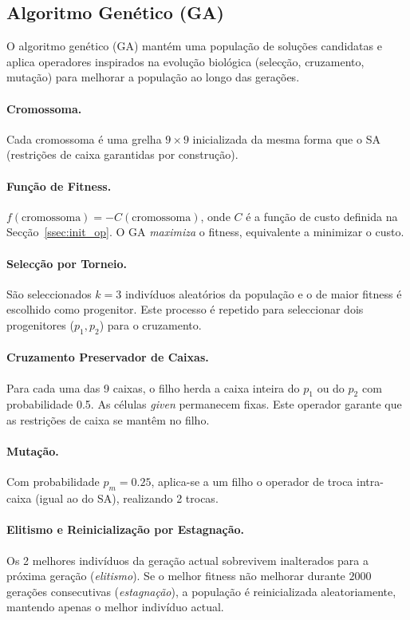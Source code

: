 \subsection{Algoritmo Genético (GA)}
\label{ssec:ga}

O algoritmo genético (GA) \cite{holland1975adaptation} mantém uma população de soluções candidatas e aplica operadores inspirados na evolução biológica (selecção, cruzamento, mutação) para melhorar a população ao longo das gerações.

\paragraph{Cromossoma.}
Cada cromossoma é uma grelha $9 \times 9$ inicializada da mesma forma que o SA (restrições de caixa garantidas por construção).

\paragraph{Função de Fitness.}
$f(\text{cromossoma}) = -C(\text{cromossoma})$, onde $C$ é a função de custo definida na Secção~\ref{ssec:init_op}. O GA \emph{maximiza} o fitness, equivalente a minimizar o custo.

\paragraph{Selecção por Torneio.}
São seleccionados $k = 3$ indivíduos aleatórios da população e o de maior fitness é escolhido como progenitor. Este processo é repetido para seleccionar dois progenitores ($p_1, p_2$) para o cruzamento.

\paragraph{Cruzamento Preservador de Caixas.}
Para cada uma das 9 caixas, o filho herda a caixa inteira do $p_1$ ou do $p_2$ com probabilidade 0.5. As células \emph{given} permanecem fixas. Este operador garante que as restrições de caixa se mantêm no filho.

\paragraph{Mutação.}
Com probabilidade $p_m = 0.25$, aplica-se a um filho o operador de troca intra-caixa (igual ao do SA), realizando 2 trocas.

\paragraph{Elitismo e Reinicialização por Estagnação.}
Os 2 melhores indivíduos da geração actual sobrevivem inalterados para a próxima geração (\emph{elitismo}). Se o melhor fitness não melhorar durante $2000$ gerações consecutivas (\emph{estagnação}), a população é reinicializada aleatoriamente, mantendo apenas o melhor indivíduo actual.

